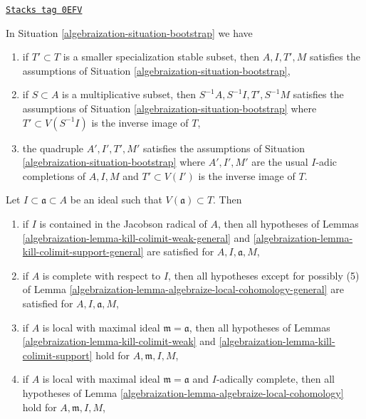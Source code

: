 \begin{lemma}
\label{algebraization-lemma-bootstrap-inherited}
\href{https://stacks.math.columbia.edu/tag/0EFV}{\texttt{Stacks tag 0EFV}}

In Situation \ref{algebraization-situation-bootstrap} we have
\begin{enumerate}
\item[(E)] if $T' \subset T$ is a smaller specialization stable subset, then
$A, I, T', M$ satisfies the assumptions of Situation \ref{algebraization-situation-bootstrap},
\item[(F)] if $S \subset A$ is a multiplicative subset, then
$S^{-1}A, S^{-1}I, T', S^{-1}M$
satisfies the assumptions of Situation \ref{algebraization-situation-bootstrap}
where $T' \subset V(S^{-1}I)$ is the inverse image of $T$,
\item[(G)] the quadruple $A', I', T', M'$
satisfies the assumptions of Situation \ref{algebraization-situation-bootstrap}
where $A', I', M'$ are the usual $I$-adic completions of $A, I, M$
and $T' \subset V(I')$ is the inverse image of $T$.
\end{enumerate}
Let $I \subset \mathfrak a \subset A$ be an ideal such that
$V(\mathfrak a) \subset T$. Then
\begin{enumerate}
\item[(A)] if $I$ is contained in the Jacobson radical of $A$,
then all hypotheses of
Lemmas \ref{algebraization-lemma-kill-colimit-weak-general} and
\ref{algebraization-lemma-kill-colimit-support-general} are satisfied
for $A, I, \mathfrak a, M$,
\item[(B)] if $A$ is complete with respect to $I$, then
all hypotheses except for possibly (5) of
Lemma \ref{algebraization-lemma-algebraize-local-cohomology-general}
are satisfied for $A, I, \mathfrak a, M$,
\item[(C)] if $A$ is local with maximal ideal $\mathfrak m = \mathfrak a$,
then all hypotheses of
Lemmas \ref{algebraization-lemma-kill-colimit-weak} and \ref{algebraization-lemma-kill-colimit-support}
hold for $A, \mathfrak m, I, M$,
\item[(D)] if $A$ is local with maximal ideal $\mathfrak m = \mathfrak a$
and $I$-adically complete, then all hypotheses of
Lemma \ref{algebraization-lemma-algebraize-local-cohomology}
hold for $A, \mathfrak m, I, M$,
\end{enumerate}
\end{lemma}

